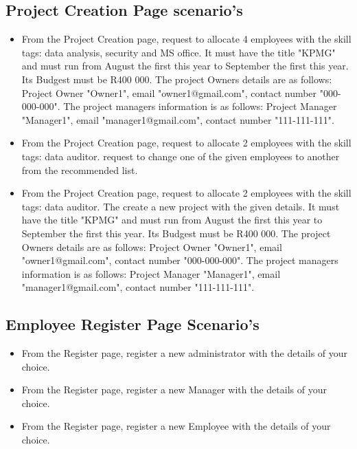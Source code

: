 \documentclass[]{article}
\begin{document}
    \subsection{Project Creation Page scenario's}
	\begin{itemize}
    	    \item From the Project Creation page, request to allocate 4 employees with the skill tags: data analysis, security and MS office. It must have the title "KPMG" and must run from August the first this year to September the first this year. Its Budgest must be R400 000. The project Owners details are as follows: Project Owner "Owner1", email "owner1@gmail.com", contact number "000-000-000". The project managers information is as follows: Project Manager "Manager1",  email "manager1@gmail.com", contact number "111-111-111".
    	    
    	    \item From the Project Creation page, request to allocate 2 employees with the skill tags: data auditor. request to change one of the given employees to another from the recommended list.
    	    
    	    \item From the Project Creation page, request to allocate 2 employees with the skill tags: data auditor. The create a new project with the given details. It must have the title "KPMG" and must run from August the first this year to September the first this year. Its Budgest must be R400 000. The project Owners details are as follows: Project Owner "Owner1", email "owner1@gmail.com", contact number "000-000-000". The project managers information is as follows: Project Manager "Manager1",  email "manager1@gmail.com", contact number "111-111-111".
    \end{itemize}
    
    \subsection{Employee Register Page Scenario's}
	\begin{itemize}
	    \item From the Register page, register a new administrator with the details of your choice.
	    
	    \item From the Register page, register a new Manager with the details of your choice.
	    
	    \item From the Register page, register a new Employee with the details of your choice.
	\end{itemize}
	
\end{document}
